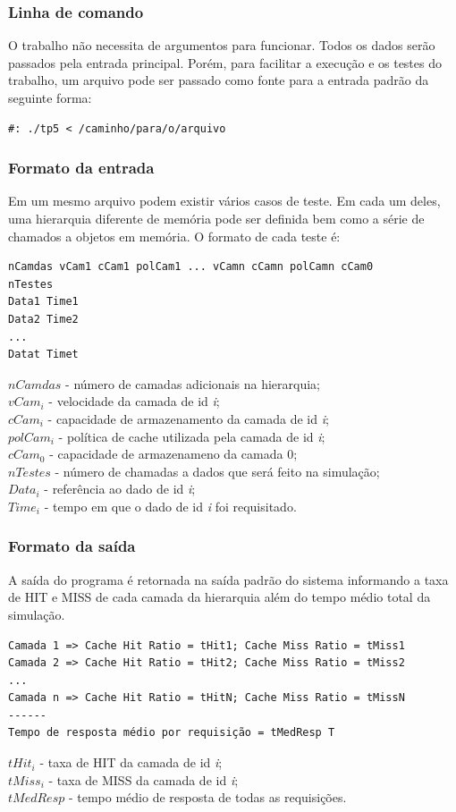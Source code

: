\documentclass[12pt]{article}
\begin{document}
\subsubsection{Linha de comando}
O trabalho não necessita de argumentos para funcionar. Todos os dados serão passados pela entrada principal. Porém, para facilitar a execução e os testes do trabalho, um arquivo pode ser passado como fonte para a entrada padrão da seguinte forma:

\begin{verbatim}
#: ./tp5 < /caminho/para/o/arquivo
\end{verbatim}

\subsubsection{Formato da entrada}
Em um mesmo arquivo podem existir vários casos de teste. Em cada um deles, uma hierarquia diferente de memória pode ser definida bem como a série de chamados a objetos em memória. O formato de cada teste é:
\begin{verbatim}
nCamdas vCam1 cCam1 polCam1 ... vCamn cCamn polCamn cCam0
nTestes
Data1 Time1
Data2 Time2
...
Datat Timet
\end{verbatim}$nCamdas$ - número de camadas adicionais na hierarquia; \\
$vCam_{i}$ - velocidade da camada de id \textit{i}; \\
$cCam_{i}$ - capacidade de armazenamento da camada de id \textit{i}; \\
$polCam_{i}$ - política de cache utilizada pela camada de id \textit{i}; \\
$cCam_{0}$ - capacidade de armazenameno da camada 0; \\
$nTestes$ - número de chamadas a dados que será feito na simulação; \\
$Data_{i}$ - referência ao dado de id \textit{i}; \\
$Time_{i}$ - tempo em que o dado de id \textit{i} foi requisitado.

\subsubsection{Formato da saída}
A saída do programa é retornada na saída padrão do sistema informando a taxa de HIT e MISS de cada camada da hierarquia além do tempo médio total da simulação.
\begin{verbatim}
Camada 1 => Cache Hit Ratio = tHit1; Cache Miss Ratio = tMiss1
Camada 2 => Cache Hit Ratio = tHit2; Cache Miss Ratio = tMiss2
...
Camada n => Cache Hit Ratio = tHitN; Cache Miss Ratio = tMissN
------
Tempo de resposta médio por requisição = tMedResp T
\end{verbatim}$tHit_{i}$ - taxa de HIT da camada de id \textit{i}; \\
$tMiss_{i}$ - taxa de MISS da camada de id \textit{i}; \\
$tMedResp$ - tempo médio de resposta de todas as requisições.
\end{document}
